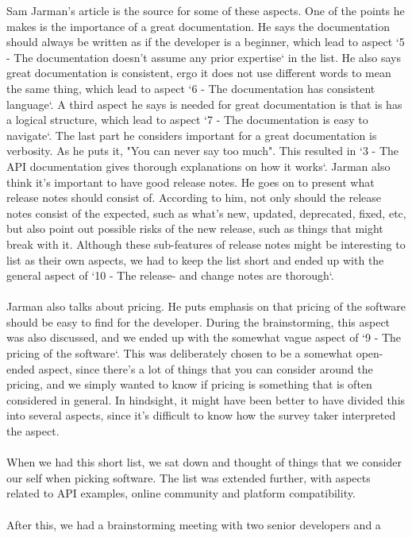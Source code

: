\documentclass{article}
\begin{document}
Sam Jarman's article is the source for some of these
aspects.\cite{jarman} One of the points he makes is the importance of a great documentation.
He says the documentation should always be written as if the developer is
a beginner, which lead to aspect `5 - The documentation doesn't assume any prior expertise` in the list.
He also says great documentation is consistent, ergo it does not use different
words to mean the same thing, which lead to aspect `6 - The documentation has consistent language`.
A third aspect he says is needed for great documentation is that is has a
logical structure, which lead to aspect `7 - The documentation is easy to navigate`.
The last part he considers important for a great documentation is verbosity.
As he puts it, "You can never say too much". This resulted in `3 - The API documentation gives thorough explanations on how it works`.
Jarman also think it's important to have good release notes. He goes on
to present what release notes should consist of. According to him, not
only should the release notes consist of the expected, such as what's new,
updated, deprecated, fixed, etc, but also point out possible risks of the new release,
such as things that might break with it. Although these sub-features of release notes
might be interesting to list as their own aspects, we had to keep the list short
and ended up with the general aspect of `10 - The release- and change notes are thorough`.
\\ \\
Jarman also talks about pricing. He puts emphasis on that pricing of the software
should be easy to find for the developer. During the brainstorming, this
aspect was also discussed, and we ended up with the somewhat vague
aspect of `9 - The pricing of the software`. This was deliberately chosen
to be a somewhat open-ended aspect, since there's a lot of things that you can
consider around the pricing, and we simply wanted to know if pricing is something
that is often considered in general. In hindsight, it might have been better to have
divided this into several aspects, since it's difficult to know how the
survey taker interpreted the aspect.
\\ \\
When we had this short list, we sat down and thought of things that we
consider our self when picking software. The list was extended further,
with aspects related to API examples, online community and  platform compatibility.
\\ \\
After this, we had a brainstorming meeting with two senior developers and a
\end{document}
